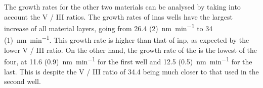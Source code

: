The growth rates for the other two materials can be analysed by taking into account the V / III ratios. The growth rates of \acs{inas} wells have the largest increase of all material layers, going from \qty[separate-uncertainty=true]{26.4 (2)}{\nano\metre\per\minute} to \qty[separate-uncertainty=true]{34 (1)}{\nano\metre\per\minute}. This growth rate is higher than that of \acs{inp}, as expected by the lower V / III ratio. On the other hand, the growth rate of the  is the lowest of the four, at \qty[separate-uncertainty=true]{11.6 (0.9)}{\nano\metre\per\minute} for the first well and \qty[separate-uncertainty=true]{12.5 (0.5)}{\nano\metre\per\minute} for the last. This is despite the V / III ratio of \num{34.4} being much closer to that used in the second well.  

\begin{figure}
    \centering
\end{figure}
